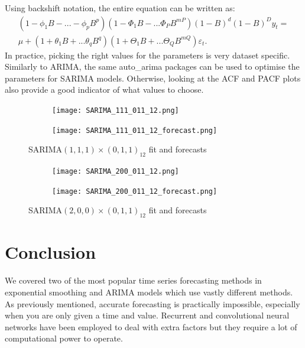 \documentclass{article}
\begin{document}
  Using backshift notation, the entire equation can be written as:
  \begin{equation*}
    \begin{split}
      (1 - \phi_1B - ... - \phi_pB^p)(1 - \Phi_1B - ... \Phi_PB^{mP})(1 - B)^d(1 - B)^D y_t = \\
      \mu + (1 + \theta_1B + ... \theta_qB^q)(1 + \Theta_1B + ... \Theta_QB^{mQ})\varepsilon_t.
    \end{split}
  \end{equation*}
  In practice, picking the right values for the parameters is very dataset specific. Similarly to ARIMA, the same auto\_arima packages can be used to optimise the parameters for SARIMA models. Otherwise, looking at the ACF and PACF plots also provide a good indicator of what values to choose.

  \begin{figure}[H]
    \centering
    \captionsetup{justification=centering}
    \begin{subfigure}[b]{0.49\linewidth}
      \texttt{[image: SARIMA\_111\_011\_12.png]}
    \end{subfigure}
    \begin{subfigure}[b]{0.49\linewidth}
      \texttt{[image: SARIMA\_111\_011\_12\_forecast.png]}
    \end{subfigure}
    \caption{SARIMA$(1,1,1)\times(0,1,1)_{12}$ fit and forecasts}
    \begin{subfigure}[b]{0.49\linewidth}
      \texttt{[image: SARIMA\_200\_011\_12.png]}
    \end{subfigure}
    \begin{subfigure}[b]{0.49\linewidth}
      \texttt{[image: SARIMA\_200\_011\_12\_forecast.png]}
    \end{subfigure}
    \caption{SARIMA$(2,0,0)\times(0,1,1)_{12}$ fit and forecasts}
  \end{figure}

  \section{Conclusion}
  We covered two of the most popular time series forecasting methods in exponential smoothing and ARIMA models which use vastly different methods. As previously mentioned, accurate forecasting is practically impossible, especially when you are only given a time and value. Recurrent and convolutional neural networks have been employed to deal with extra factors but they require a lot of computational power to operate. 
\end{document}
